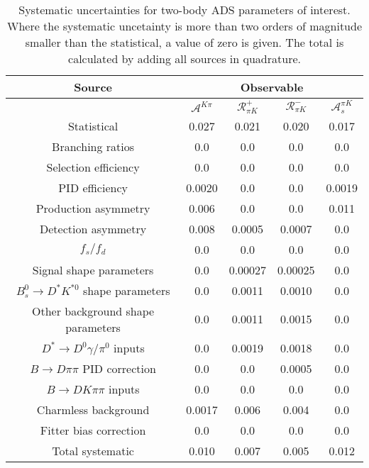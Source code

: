 \begin{sidewaystable}
  \centering
  \begin{tabular}{ccccc}
      \toprule
      Source & \multicolumn{4}{c}{Observable} \\
      \midrule
       & $\mathcal{A}^{K\pi}$ & $\mathcal{R}_{\pi K}^+$ & $\mathcal{R}_{\pi K}^-$ & $\mathcal{A}_s^{\pi K}$ \\
      \midrule
      Statistical & 0.027 & 0.021 & 0.020 & 0.017 \\
      \midrule
      Branching ratios & 0.0  & 0.0  & 0.0  & 0.0  \\
      Selection efficiency & 0.0  & 0.0  & 0.0  & 0.0  \\
      PID efficiency & 0.0020 & 0.0  & 0.0  & 0.0019 \\
      Production asymmetry & 0.006 & 0.0  & 0.0  & 0.011 \\
      Detection asymmetry & 0.008 & 0.0005 & 0.0007 & 0.0  \\
      $f_s/f_d$ & 0.0  & 0.0  & 0.0  & 0.0  \\
      Signal shape parameters & 0.0  & 0.00027 & 0.00025 & 0.0  \\
      $B^0_s \to D^* K^{*0}$ shape parameters & 0.0  & 0.0011 & 0.0010 & 0.0  \\
      Other background shape parameters & 0.0  & 0.0011 & 0.0015 & 0.0  \\
      $D^* \to D^0 \gamma/\pi^0$ inputs & 0.0  & 0.0019 & 0.0018 & 0.0  \\
      $B\to D\pi\pi$ PID correction & 0.0  & 0.0  & 0.0005 & 0.0  \\
      $B\to DK\pi\pi$ inputs & 0.0  & 0.0  & 0.0  & 0.0  \\
      Charmless background & 0.0017 & 0.006 & 0.004 & 0.0  \\
      Fitter bias correction & 0.0  & 0.0  & 0.0  & 0.0  \\
      \midrule
      Total systematic & 0.010 & 0.007 & 0.005 & 0.012 \\
      \bottomrule
  \end{tabular}
  \caption{Systematic uncertainties for two-body ADS parameters of interest. Where the systematic uncetainty is more than two orders of magnitude smaller than the statistical, a value of zero is given. The total is calculated by adding all sources in quadrature.}
\label{tab:twoBody_ADS_systematics}
\end{sidewaystable}
